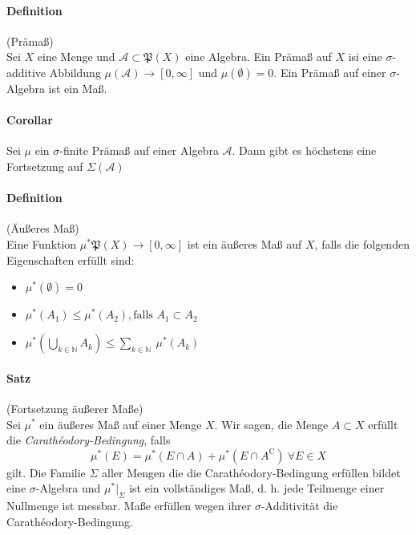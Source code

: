 \documentclass[12pt,a4paper,fleqn]{article}
\begin{document}
\paragraph{Definition} (Prämaß)\\
Sei $X$ eine Menge und $\mathcal{A} \subset \mathfrak{P}(X)$ eine Algebra. Ein Prämaß auf $X$ isi eine $\sigma$-additive Abbildung $\mu(\mathcal{A}) \rightarrow [0, \infty]$ und $\mu(\emptyset) = 0$. Ein Prämaß auf einer $\sigma$-Algebra ist ein Maß.

\paragraph{Corollar} Sei $\mu$ ein $\sigma$-finite Prämaß auf einer Algebra $\mathcal{A}$. Dann gibt es höchstens eine Fortsetzung auf $\Sigma(\mathcal{A})$

\paragraph{Definition} (Äußeres Maß)\\
Eine Funktion $\mu^* \mathfrak{P}(X) \rightarrow [0, \infty]$ ist ein äußeres Maß auf $X$, falls die folgenden Eigenschaften erfüllt sind:
\begin{itemize}
\item$\mu^*(\emptyset) = 0$
\item$\mu^*(A_1) \leq \mu^*(A_2), \text{falls } A_1 \subset A_2$
\item$\mu^*(\bigcup_{k \in \mathbb{N}}A_k) \leq \sum_{k \in \mathbb{N}}\ \mu^*(A_k)$
\end{itemize}

\paragraph{Satz} (Fortsetzung äußerer Maße)\\
Sei $\mu^*$ ein äußeres Maß auf einer Menge $X$. Wir sagen, die Menge $A \subset X$ erfüllt die \textit{Carathéodory-Bedingung}, falls 
\begin{displaymath}
\mu^*(E) = \mu^*(E\cap A) + \mu^*(E \cap A^\mathrm{C})\ \forall E \in X
\end{displaymath}
gilt. Die Familie $\Sigma$ aller Mengen die die Carathéodory-Bedingung erfüllen bildet eine $\sigma$-Algebra und $\mu^*\vert_\Sigma$ ist ein vollständiges Maß, d. h. jede Teilmenge einer Nullmenge ist messbar. Maße erfüllen wegen ihrer $\sigma$-Additivität die Carathéodory-Bedingung.
\end{document}
